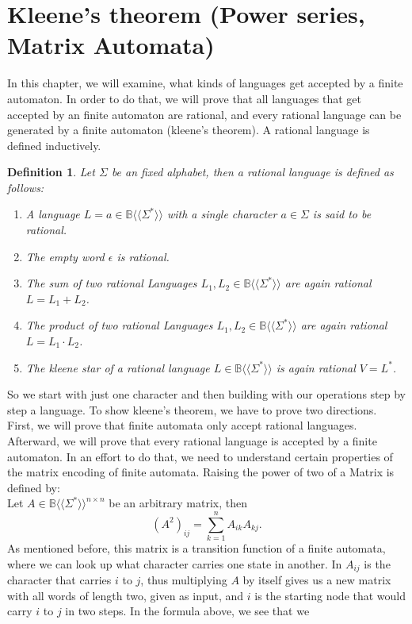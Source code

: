 \documentclass[12pt,letterpaper]{article}
\newtheorem{definition}{Definition}
\newcommand{\fps}[1] {
\mathbb{#1}\langle \langle \Sigma^* \rangle \rangle
}
\begin{document}
\section{Kleene's theorem (Power series, Matrix Automata)}
In this chapter, we will examine, what kinds of languages get accepted by a finite automaton. In order to do that, we will prove that all languages that get accepted by an finite automaton are rational, and every rational language can be generated by a finite automaton (kleene's theorem).
A rational language is defined inductively.\\
\pagebreak
\begin{definition}
  Let $\Sigma$ be an fixed alphabet, then a rational language 
  is defined as follows:
  \begin{enumerate}
    \item A language $L = a \in \fps{B}$ with a single character 
      $a \in \Sigma$ is said to be rational.
    \item The empty word $\epsilon$ is rational.
    \item The sum of two rational Languages $L_1, L_2 \in \fps{B}$
      are again rational $L = L_1 + L_2$.
    \item The product of two rational Languages $L_1, L_2 \in \fps{B}$
      are again rational $L = L_1 \cdot L_2$.
    \item The kleene star of a rational language $L \in \fps{B}$ 
        is again rational $V = L^*$.
  \end{enumerate}
\end{definition}
So we start with just one character and then building with our operations step by step  a language. 
To show kleene's theorem, we have to prove two directions. 
First, we will prove that finite automata only accept rational  languages. 
Afterward, we will prove that every rational language is accepted by a finite automaton. 
In an effort to do that, we need to understand certain properties of the matrix encoding of finite automata.
Raising the power of two of a Matrix is defined by:\\
Let $A \in \fps{B}^{n\times n}$ be an arbitrary matrix, then
\[ 
  (A^2)_{ij} = \sum_{k=1}^{n} A_{ik}A_{kj}.
\]
As mentioned before, this matrix is a transition function of a finite
automata, where we can look up what character carries one state in another.
In $A_{ij}$ is the character that carries $i$ to $j$, thus multiplying
$A$ by itself gives us a new matrix with all words of length two, given as input, and $i$ is the starting node that would carry $i$ to $j$ in two steps. In the formula above, we see that we
\end{document}
